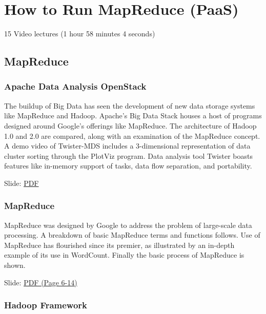 \part{How to Run MapReduce (PaaS)}

  15 Video lectures (1 hour 58 minutes 4 seconds)

\chapter{MapReduce}

\section{Apache Data Analysis OpenStack}

The buildup of Big Data has seen the development of new data storage
systems like MapReduce and Hadoop. Apache's Big Data Stack houses a host
of programs designed around Google's offerings like MapReduce. The
architecture of Hadoop 1.0 and 2.0 are compared, along with an
examination of the MapReduce concept. A demo video of Twister-MDS
includes a 3-dimensional representation of data cluster sorting through
the PlotViz program. Data analysis tool Twister boasts features like
in-memory support of tasks, data flow separation, and portability.


  Slide:
  \href{https://drive.google.com/open?id=0B88HKpainTSfMnpCelpNQUpNdVE}{PDF}

\section{MapReduce}

MapReduce was designed by Google to address the problem of large-scale
data processing. A breakdown of basic MapReduce terms and functions
follows. Use of MapReduce has flourished since its premier, as
illustrated by an in-depth example of its use in WordCount. Finally the
basic process of MapReduce is shown.


  Slide:
  \href{https://drive.google.com/open?id=0B88HKpainTSfMnpCelpNQUpNdVE}{PDF
  (Page 6-14)}

\section{Hadoop Framework}

